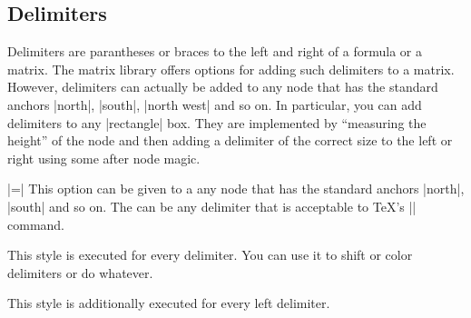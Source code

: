 \subsection{Delimiters}

Delimiters are parantheses or braces to the left and right of a
formula or a matrix. The matrix library offers options for adding such
delimiters to a matrix. However, delimiters can actually be added to
any node that has the standard anchors |north|, |south|, |north west|
and so on. In particular, you can add delimiters to any |rectangle|
box. They are implemented by ``measuring the height'' of the node and
then adding a delimiter of the correct size to the left or right using
some after node magic.

\begin{itemize}
  |=|
  This option can be given to a any node that has the standard anchors
  |north|, |south| and so on. The  can be any
  delimiter that is acceptable to \TeX's |\left| command.
\begin{codeexample}[]
\end{codeexample}

\begin{codeexample}[]
\end{codeexample}

  This style is executed for every delimiter. You can use it to shift
  or color delimiters or do whatever.

  This style is additionally executed for every left delimiter.
\begin{codeexample}[]
\end{codeexample}


\end{itemize}
